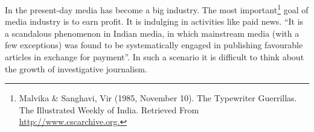 \begin{multicols}{2}
\vspace{-.15cm}


\vspace{-.1cm}

\noi
In the present-day media has become a big industry. The most important\footnote{Malvika \& Sanghavi, Vir (1985, November 10). The Typewriter Guerrillas. The Illustrated Weekly of India. Retrieved From \url{http://www.cscarchive.org.}} goal of media industry is to earn profit. It is indulging in activities like paid news. “It is a scandalous phenomenon in Indian media, in which mainstream media (with a few exceptions) was found to be systematically engaged in publishing favourable articles in exchange for payment”. In such a scenario it is difficult to think about the growth of investigative journalism.

\vspace{-.15cm}


\vspace{-.1cm}


\end{multicols}
